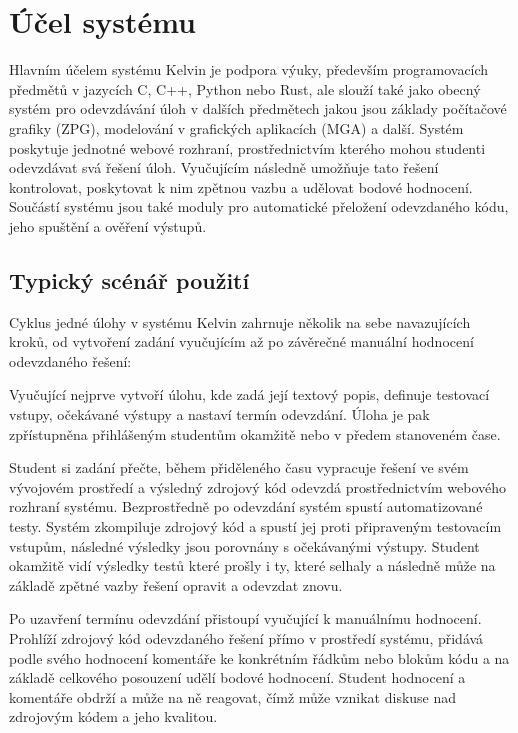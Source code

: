 \section{Účel systému}
\label{sec:kelvin-purpose}

Hlavním účelem systému Kelvin je podpora výuky, především programovacích předmětů v jazycích C, C++, Python nebo Rust, ale slouží také jako obecný systém pro odevzdávání úloh v dalších předmětech jakou jsou základy počítačové grafiky (ZPG), modelování v grafických aplikacích (MGA) a další.
Systém poskytuje jednotné webové rozhraní, prostřednictvím kterého mohou studenti odevzdávat svá řešení úloh.
Vyučujícím následně umožňuje tato řešení kontrolovat, poskytovat k nim zpětnou vazbu a udělovat bodové hodnocení.
Součástí systému jsou také moduly pro automatické přeložení odevzdaného kódu, jeho spuštění a ověření výstupů.

\subsection{Typický scénář použití}
\label{subsec:kelvin-workflow}

Cyklus jedné úlohy v systému Kelvin zahrnuje několik na sebe navazujících kroků, od vytvoření zadání vyučujícím až po závěrečné manuální hodnocení odevzdaného řešení:

Vyučující nejprve vytvoří úlohu, kde zadá její textový popis, definuje testovací vstupy, očekávané výstupy a nastaví termín odevzdání.
Úloha je pak zpřístupněna přihlášeným studentům okamžitě nebo v předem stanoveném čase.

Student si zadání přečte, během přiděleného času vypracuje řešení ve svém vývojovém prostředí a výsledný zdrojový kód odevzdá prostřednictvím webového rozhraní systému.
Bezprostředně po odevzdání systém spustí automatizované testy.
Systém zkompiluje zdrojový kód a spustí jej proti připraveným testovacím vstupům, následné výsledky jsou porovnány s očekávanými výstupy.
Student okamžitě vidí výsledky testů které prošly i ty, které selhaly a následně může na základě zpětné vazby řešení opravit a odevzdat znovu.

Po uzavření termínu odevzdání přistoupí vyučující k manuálnímu hodnocení.
Prohlíží zdrojový kód odevzdaného řešení přímo v prostředí systému, přidává podle svého hodnocení komentáře ke konkrétním řádkům nebo blokům kódu a na základě celkového posouzení udělí bodové hodnocení.
Student hodnocení a komentáře obdrží a může na ně reagovat, čímž může vznikat diskuse nad zdrojovým kódem a jeho kvalitou.

